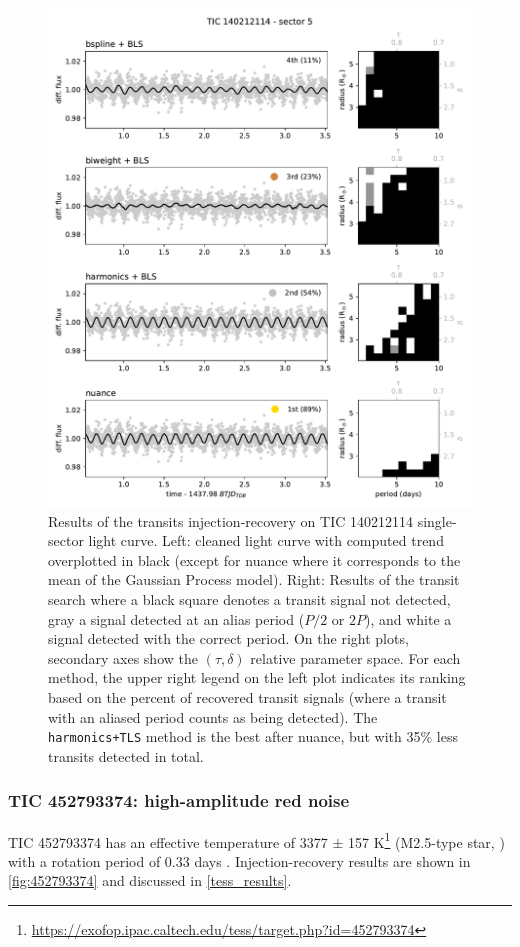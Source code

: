 \documentclass{aastex631}
\newcommand{\footlink}[1]{\footnote{\url{#1}}}
\begin{document}
\begin{figure}[H]
    \begin{centering}
        \includegraphics[width=0.8\linewidth]{140212114.pdf}
        \caption{Results of the transits injection-recovery on TIC 140212114 single-sector light curve. Left: cleaned light curve with computed trend overplotted in black (except for \textsf{nuance} where it corresponds to the mean of the Gaussian Process model). Right: Results of the transit search where a black square denotes a transit signal not detected, gray a signal detected at an alias period ($P/2$ or $2P$), and  white a signal detected with the correct period. On the right plots, secondary axes show the $(\tau, \delta)$ relative parameter space. For each method, the upper right legend on the left plot indicates its ranking based on the percent of recovered transit signals (where a transit with an aliased period counts as being detected). The \texttt{harmonics+TLS} method is the best after \textsf{nuance}, but with 35\% less transits detected in total. 
        }
        \label{fig:140212114}
    \end{centering}
\end{figure}

\subsubsection*{TIC 452793374: high-amplitude red noise}
TIC 452793374 has an effective temperature of 3377 $\pm$ 157 K\footlink{https://exofop.ipac.caltech.edu/tess/target.php?id=452793374} (M2.5-type star, \citealt{Rajpurohit2013}) with a rotation period of 0.33 days \citep{Ramsay2020}. Injection-recovery results are shown in \autoref{fig:452793374} and discussed in \autoref{tess_results}.
\end{document}
